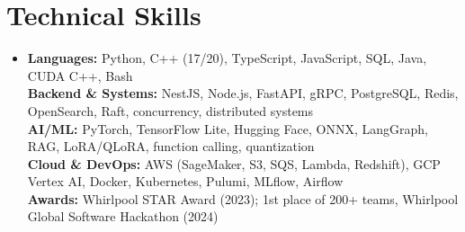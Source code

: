 \documentclass[letterpaper,10pt]{article}
\newcommand{\listS}{\begin{itemize}[leftmargin=0.15in,label={}]}
\newcommand{\listE}{\end{itemize}}
\begin{document}
\section{Technical Skills}
\listS
\item[]\small
\textbf{Languages:} Python, C++ (17/20), TypeScript, JavaScript, SQL, Java, CUDA C++, Bash\\
\textbf{Backend \& Systems:} NestJS, Node.js, FastAPI, gRPC, PostgreSQL, Redis, OpenSearch, Raft, concurrency, distributed systems\\
\textbf{AI/ML:} PyTorch, TensorFlow Lite, Hugging Face, ONNX, LangGraph, RAG, LoRA/QLoRA, function calling, quantization\\
\textbf{Cloud \& DevOps:} AWS (SageMaker, S3, SQS, Lambda, Redshift), GCP Vertex AI, Docker, Kubernetes, Pulumi, MLflow, Airflow\\
\textbf{Awards:} Whirlpool STAR Award (2023); 1st place of 200+ teams, Whirlpool Global Software Hackathon (2024)
\listE
\end{document}
